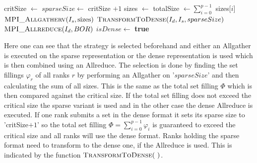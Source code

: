 \begin{algorithm}
	\caption{Implementation of the naive mixed method set union.\\
		$I_s$: input array with sparse representation of $S_r$\\
		$sparseSize$: length of sparse list\\
		$I_d$: input array with dense representation of $S_r$\\
		$isDense$: bool to indicate, which representation holds} 
	\label{algo:naiveMixed}
	\begin{algorithmic}[1]
		\State critSize $\gets$ 
			\State $sparseSize \gets$ critSize $+ 1$
		\EndIf
		\State sizes $\gets$  \label{naiveMixed:algatherSize}
		\State totalSize $\gets \sum_{i=0}^{p-1}$ sizes[$i$]
			\State $\Call{MPI\_Allgatherv}{I_s, \text{sizes}}$
		\Else
				\State $\Call{TransformToDense}{I_d, I_s, sparseSize}$
			\EndIf
			\State $\Call{MPI\_Allreduce}{I_d, BOR}$
			\State $isDense \gets$ \textbf{true}
		\EndIf
		\EndProcedure
	\end{algorithmic}
\end{algorithm}
Here one can see that the strategy is selected beforehand and either an Allgather is executed on the sparse representation or the dense representation is used which is then combined using an Allreduce. The selection is done by finding the set fillings $\varphi_r$ of all ranks $r$ by performing an Allgather on '$sparseSize$' and then calculating the sum of all sizes. This is the same as the total set filling $\Phi$ which is then compared against the critical size. If the total set filling does not exceed the critical size the sparse variant is used and in the other case the dense Allreduce is executed. If one rank submits a set in the dense format it sets its sparse size to 'critSize$+1$' so the total set filling $\Phi=\sum_{i=0}^{p-1}\varphi_i$ is guaranteed to exceed the critical size and all ranks will use the dense format. Ranks holding the sparse format need to transform to the dense one, if the Allreduce is used. This is indicated by the function $\Call{TransformToDense}{~}$.\\
